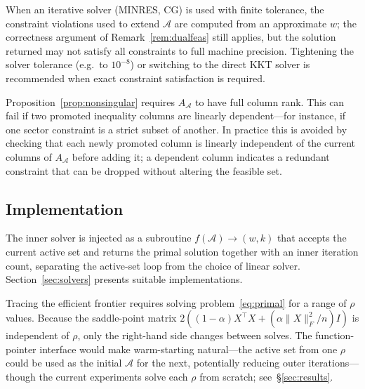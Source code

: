 \documentclass{siam/siamart}
\begin{document}
\begin{remark}
When an iterative solver (MINRES, CG) is used with finite tolerance, the constraint
violations used to extend $\mathcal{A}$ are computed from an approximate $w$; the
correctness argument of Remark~\ref{rem:dualfeas} still applies, but the solution
returned may not satisfy all constraints to full machine precision.  Tightening the
solver tolerance (e.g.\ to $10^{-8}$) or switching to the direct KKT solver is
recommended when exact constraint satisfaction is required.
\end{remark}

\begin{remark}
Proposition~\ref{prop:nonsingular} requires $A_{\mathcal{A}}$ to have full column rank.
This can fail if two promoted inequality columns are linearly dependent---for instance,
if one sector constraint is a strict subset of another.  In practice this is avoided by
checking that each newly promoted column is linearly independent of the current columns
of $A_{\mathcal{A}}$ before adding it; a dependent column indicates a redundant
constraint that can be dropped without altering the feasible set.
\end{remark}

\subsection{Implementation}

The inner solver is injected as a subroutine $f(\mathcal{A}) \to (w, k)$
that accepts the current active set and returns the primal solution together
with an inner iteration count, separating the active-set loop from the choice
of linear solver.  Section~\ref{sec:solvers} presents suitable implementations.

\begin{remark}\label{rem:warmstart}
Tracing the efficient frontier requires solving problem~\eqref{eq:primal} for a range
of $\rho$ values.  Because the saddle-point matrix $2((1-\alpha)X^\top X + (\alpha\|X\|_F^2/n)I)$
is independent of $\rho$, only the right-hand side changes between solves.  The
function-pointer interface would make warm-starting natural---the active set from one
$\rho$ could be used as the initial $\mathcal{A}$ for the next, potentially reducing
outer iterations---though the current experiments solve each $\rho$ from scratch;
see~\S\ref{sec:results}.
\end{remark}
\end{document}
